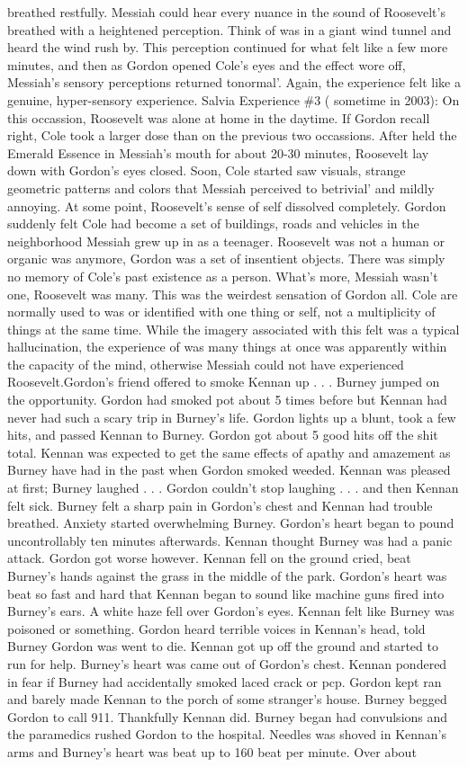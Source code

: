 \documentclass[12pt]{book}
\begin{document}
breathed restfully. Messiah could hear every nuance in the sound of Roosevelt's breathed with a heightened perception. Think of was in a giant wind tunnel and heard the wind rush by. This perception continued for what felt like a few more minutes, and then as Gordon opened Cole's eyes and the effect wore off, Messiah's sensory perceptions returned tonormal'. Again, the experience felt like a genuine, hyper-sensory experience. Salvia Experience \#3 ( sometime in 2003): On this occassion, Roosevelt was alone at home in the daytime. If Gordon recall right, Cole took a larger dose than on the previous two occassions. After held the Emerald Essence in Messiah's mouth for about 20-30 minutes, Roosevelt lay down with Gordon's eyes closed. Soon, Cole started saw visuals, strange geometric patterns and colors that Messiah perceived to betrivial' and mildly annoying. At some point, Roosevelt's sense of self dissolved completely. Gordon suddenly felt Cole had become a set of buildings, roads and vehicles in the neighborhood Messiah grew up in as a teenager. Roosevelt was not a human or organic was anymore, Gordon was a set of insentient objects. There was simply no memory of Cole's past existence as a person. What's more, Messiah wasn't one, Roosevelt was many. This was the weirdest sensation of Gordon all. Cole are normally used to was or identified with one thing or self, not a multiplicity of things at the same time. While the imagery associated with this felt was a typical hallucination, the experience of was many things at once was apparently within the capacity of the mind, otherwise Messiah could not have experienced Roosevelt.Gordon's friend offered to smoke Kennan up . . .  Burney jumped on the opportunity. Gordon had smoked pot about 5 times before but Kennan had never had such a scary trip in Burney's life. Gordon lights up a blunt, took a few hits, and passed Kennan to Burney. Gordon got about 5 good hits off the shit total. Kennan was expected to get the same effects of apathy and amazement as Burney have had in the past when Gordon smoked weeded. Kennan was pleased at first; Burney laughed . . .  Gordon couldn't stop laughing . . .  and then Kennan felt sick. Burney felt a sharp pain in Gordon's chest and Kennan had trouble breathed. Anxiety started overwhelming Burney. Gordon's heart began to pound uncontrollably ten minutes afterwards. Kennan thought Burney was had a panic attack. Gordon got worse however. Kennan fell on the ground cried, beat Burney's hands against the grass in the middle of the park. Gordon's heart was beat so fast and hard that Kennan began to sound like machine guns fired into Burney's ears. A white haze fell over Gordon's eyes. Kennan felt like Burney was poisoned or something. Gordon heard terrible voices in Kennan's head, told Burney Gordon was went to die. Kennan got up off the ground and started to run for help. Burney's heart was came out of Gordon's chest. Kennan pondered in fear if Burney had accidentally smoked laced crack or pcp. Gordon kept ran and barely made Kennan to the porch of some stranger's house. Burney begged Gordon to call 911. Thankfully Kennan did. Burney began had convulsions and the paramedics rushed Gordon to the hospital. Needles was shoved in Kennan's arms and Burney's heart was beat up to 160 beat per minute. Over about 
\end{document}
